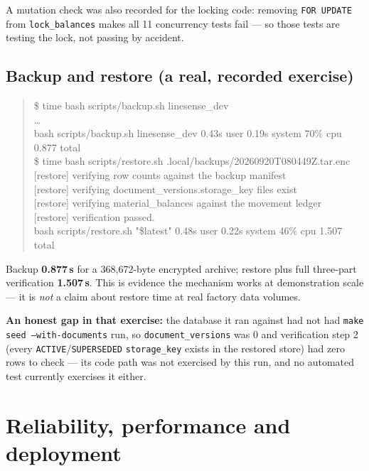 \documentclass[11pt,a4paper]{article}
\begin{document}
A mutation check was also recorded for the locking code: removing
\texttt{FOR UPDATE} from \texttt{lock\_balances} makes all 11 concurrency tests
fail --- so those tests are testing the lock, not passing by accident.

\subsection{Backup and restore (a real, recorded exercise)}

\begin{quote}\small\ttfamily
\$ time bash scripts/backup.sh linesense\_dev\\
\dots\\
bash scripts/backup.sh linesense\_dev  0.43s user 0.19s system 70\% cpu 0.877 total\\[4pt]
\$ time bash scripts/restore.sh .local/backups/20260920T080449Z.tar.enc\\
{[restore]} verifying row counts against the backup manifest\\
{[restore]} verifying document\_versions.storage\_key files exist\\
{[restore]} verifying material\_balances against the movement ledger\\
{[restore]} verification passed.\\
bash scripts/restore.sh "\$latest"  0.48s user 0.22s system 46\% cpu 1.507 total
\end{quote}

Backup \textbf{0.877\,s} for a 368{,}672-byte encrypted archive; restore plus
full three-part verification \textbf{1.507\,s}. This is evidence the mechanism
works at demonstration scale --- it is \emph{not} a claim about restore time at
real factory data volumes.

\textbf{An honest gap in that exercise:} the database it ran against had not had
\texttt{make seed --with-documents} run, so \texttt{document\_versions} was 0 and
verification step 2 (every \texttt{ACTIVE}/\texttt{SUPERSEDED}
\texttt{storage\_key} exists in the restored store) had zero rows to check ---
its code path was not exercised by this run, and no automated test currently
exercises it either.

\section{Reliability, performance and deployment}
\end{document}
